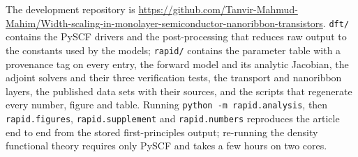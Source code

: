 \documentclass[aip,apl,amsmath,amssymb,reprint,longbibliography]{revtex4-1}
\begin{document}
The development repository is
\url{https://github.com/Tanvir-Mahmud-Mahim/Width-scaling-in-monolayer-semiconductor-nanoribbon-transistors}.
\texttt{dft/} contains the PySCF drivers and the post-processing that reduces
raw output to the constants used by the models; \texttt{rapid/} contains the
parameter table with a provenance tag on every entry, the forward model and its
analytic Jacobian, the adjoint solvers and their three verification tests, the
transport and nanoribbon layers, the published data sets with their sources,
and the scripts that regenerate every number, figure and table. Running
\texttt{python -m rapid.analysis}, then \texttt{rapid.figures},
\texttt{rapid.supplement} and \texttt{rapid.numbers} reproduces the article end
to end from the stored first-principles output; re-running the density
functional theory requires only PySCF and takes a few hours on two cores.

\nocite{aip41Control}


\end{document}
